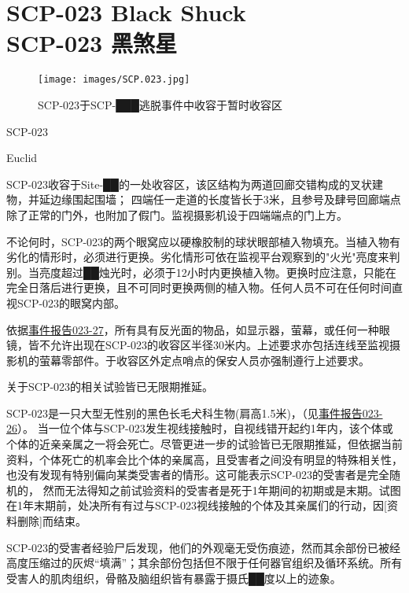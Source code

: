 \chapter[SCP-023 黑煞星]{
    SCP-023 Black Shuck\\
    SCP-023 黑煞星
}

\label{chap:SCP-023}

\begin{figure}[H]
    \centering
    \texttt{[image: images/SCP.023.jpg]}
    \caption*{SCP-023于SCP-███逃脱事件中收容于暂时收容区}
\end{figure}

SCP-023

Euclid

 SCP-023收容于Site-██的一处收容区，该区结构为两道回廊交错构成的叉状建物，并延边缘围起围墙； 四端任一走道的长度皆长于3米，且参号及肆号回廊端点除了正常的门外，也附加了假门。监视摄影机设于四端端点的门上方。

不论何时，SCP-023的两个眼窝应以硬橡胶制的球状眼部植入物填充。当植入物有劣化的情形时，必须进行更换。劣化情形可依在监视平台观察到的"火光"亮度来判别。当亮度超过██烛光时，必须于12小时内更换植入物。更换时应注意，只能在完全日落后进行更换，且不可同时更换两侧的植入物。任何人员不可在任何时间直视SCP-023的眼窝内部。

依据\hyperref[sec:DOC-incident-023-27]{事件报告023-27}，所有具有反光面的物品，如显示器，萤幕，或任何一种眼镜，皆不允许出现在SCP-023的收容区半径30米内。上述要求亦包括连线至监视摄影机的萤幕零部件。于收容区外定点哨点的保安人员亦强制遵行上述要求。

关于SCP-023的相关试验皆已无限期推延。

SCP-023是一只大型无性别的黑色长毛犬科生物(肩高1.5米)，（见\hyperref[sec:DOC-incident-report-023-26]{事件报告023-26}）。 当一位个体与SCP-023发生视线接触时，自视线错开起约1年内，该个体或个体的近亲亲属之一将会死亡。尽管更进一步的试验皆已无限期推延，但依据当前资料，个体死亡的机率会比个体的亲属高，且受害者之间没有明显的特殊相关性，也没有发现有特别偏向某类受害者的情形。这可能表示SCP-023的受害者是完全随机的， 然而无法得知之前试验资料的受害者是死于1年期间的初期或是末期。试图在1年末期前，处决所有有过与SCP-023视线接触的个体及其亲属们的行动，因[资料删除]而结束。

SCP-023的受害者经验尸后发现，他们的外观毫无受伤痕迹，然而其余部份已被经高度压缩过的灰烬“填满”；其余部份包括但不限于任何器官组织及循环系统。所有受害人的肌肉组织，骨骼及脑组织皆有暴露于摄氏██度以上的迹象。

